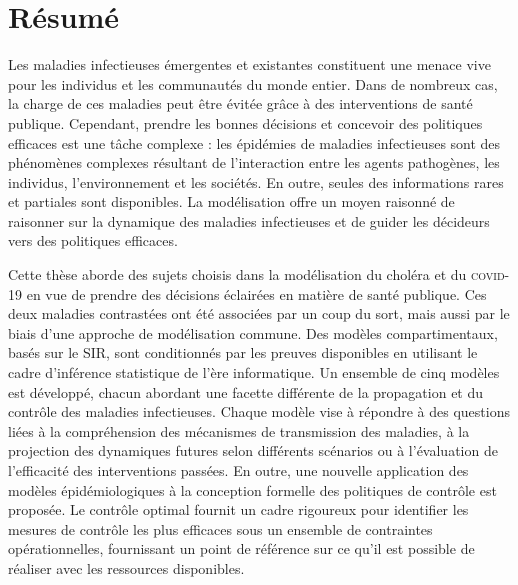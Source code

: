  \chapter*{Résumé} 
\vspace{-.5cm}
 Les maladies infectieuses émergentes et existantes constituent une menace vive pour les individus et les communautés du monde entier. Dans de nombreux cas, la charge de ces maladies peut être évitée grâce à des interventions de santé publique. Cependant, prendre les bonnes décisions et concevoir des politiques efficaces est une tâche complexe : les épidémies de maladies infectieuses sont des phénomènes complexes résultant de l'interaction entre les agents pathogènes, les individus, l'environnement et les sociétés. En outre, seules des informations rares et partiales sont disponibles. La modélisation offre un moyen raisonné de raisonner sur la dynamique des maladies infectieuses et de guider les décideurs vers des politiques efficaces. 

Cette thèse aborde des sujets choisis dans la modélisation du choléra et du \textsc{covid}-19 en vue de prendre des décisions éclairées en matière de santé publique. Ces deux maladies contrastées ont été associées par un coup du sort, mais aussi par le biais d'une approche de modélisation commune.  Des modèles compartimentaux, basés sur le SIR, sont conditionnés par les preuves disponibles en utilisant le cadre d'inférence statistique de l'ère informatique. Un ensemble de cinq modèles est développé, chacun abordant une facette différente de la propagation et du contrôle des maladies infectieuses. Chaque modèle vise à répondre à des questions liées à la compréhension des mécanismes de transmission des maladies, à la projection des dynamiques futures selon différents scénarios ou à l'évaluation de l'efficacité des interventions passées. En outre, une nouvelle application des modèles épidémiologiques à la conception formelle des politiques de contrôle est proposée. Le contrôle optimal fournit un cadre rigoureux pour identifier les mesures de contrôle les plus efficaces sous un ensemble de contraintes opérationnelles, fournissant un point de référence sur ce qu'il est possible de réaliser avec les ressources disponibles.

